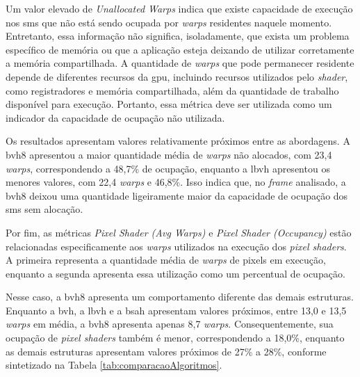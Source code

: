 Um valor elevado de \textit{Unallocated Warps} indica que existe capacidade de execução nos \glspl{sm} que não está sendo ocupada por \textit{warps} residentes naquele momento. Entretanto, essa informação não significa, isoladamente, que exista um problema específico de memória ou que a aplicação esteja deixando de utilizar corretamente a memória compartilhada. A quantidade de \textit{warps} que pode permanecer residente depende de diferentes recursos da \gls{gpu}, incluindo recursos utilizados pelo \textit{shader}, como registradores e memória compartilhada, além da quantidade de trabalho disponível para execução. Portanto, essa métrica deve ser utilizada como um indicador da capacidade de ocupação não utilizada.

Os resultados apresentam valores relativamente próximos entre as abordagens. A \gls{bvh8} apresentou a maior quantidade média de \textit{warps} não alocados, com 23,4 \textit{warps}, correspondendo a 48,7\% de ocupação, enquanto a \gls{lbvh} apresentou os menores valores, com 22,4 \textit{warps} e 46,8\%. Isso indica que, no \textit{frame} analisado, a \gls{bvh8} deixou uma quantidade ligeiramente maior da capacidade de ocupação dos \glspl{sm} sem alocação.

Por fim, as métricas \textit{Pixel Shader (Avg Warps)} e \textit{Pixel Shader (Occupancy)} estão relacionadas especificamente aos \textit{warps} utilizados na execução dos \textit{pixel shaders}. A primeira representa a quantidade média de \textit{warps} de pixels em execução, enquanto a segunda apresenta essa utilização como um percentual de ocupação.

Nesse caso, a \gls{bvh8} apresenta um comportamento diferente das demais estruturas. Enquanto a \gls{bvh}, a \gls{lbvh} e a \gls{bsah} apresentam valores próximos, entre 13,0 e 13,5 \textit{warps} em média, a \gls{bvh8} apresenta apenas 8,7 \textit{warps}. Consequentemente, sua ocupação de \textit{pixel shaders} também é menor, correspondendo a 18,0\%, enquanto as demais estruturas apresentam valores próximos de 27\% a 28\%, conforme sintetizado na Tabela \ref{tab:comparacaoAlgoritmos}.

